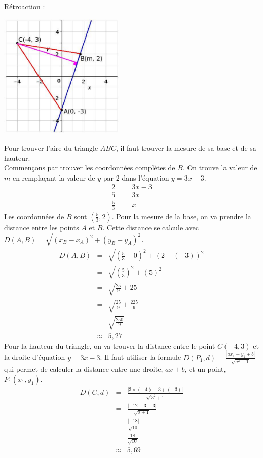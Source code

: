 \documentclass[letterpaper, 12pt]{article}
\begin{document}
R\'etroaction :\\
\begin{center}
 \includegraphics[width=6cm,bb=14 14 415 415]{Q2480r.eps}
\end{center}
Pour trouver l'aire du triangle $ABC$, il faut trouver la mesure de sa base et de sa hauteur. \\
Commen\c cons par trouver les coordonn\'ees compl\`etes de $B$. On trouve la valeur de $m$ en rempla\c cant la valeur de $y$ par 2 dans l'\'equation $y=3x-3$.
\begin{eqnarray*}
 2&=&3x-3\\
 5&=&3x\\[2mm]
 \frac{5}{3}&=&x
\end{eqnarray*}
 Les coordonn\'ees de $B$ sont $(\frac{5}{3}, 2)$. Pour la mesure de la base, on va prendre la distance entre les points $A$ et $B$. Cette distance se calcule avec $D(A, B)=\sqrt{(x_{B}-x_{A})^{2}+(y_{B}-y_{A})^{2}}$.
\begin{eqnarray*}
 D(A, B)&=&\sqrt{\left( \frac{5}{3}-0\right) ^{2}+(2-(-3))^{2}}\\[2mm]
&=&\sqrt{\left( \frac{5}{3}\right) ^{2}+(5)^{2}}\\[2mm]
&=&\sqrt{\frac{25}{9}+25}\\[2mm]
&=&\sqrt{\frac{25}{9}+\frac{225}{9}}\\[2mm]
&=&\sqrt{\frac{250}{9}}\\[2mm]
&\approx&5,27
\end{eqnarray*}
Pour la hauteur du triangle, on va trouver la distance entre le point $C(-4, 3)$ et la droite d'\'equation $y=3x-3$. Il faut utiliser la formule $D(P_{1}, d)=\frac{|ax_{1}-y_{1}+b|}{\sqrt{a^{2}+1}}$ qui permet de calculer la distance entre une droite, $ax+b$, et un point, $P_{1}(x_{1}, y_{1})$.
\begin{eqnarray*}
 D(C, d)&=&\frac{|3\times(-4)-3+(-3) |}{\sqrt{3^{2}+1}}\\[2mm]
&=&\frac{|-12-3-3|}{\sqrt{9+1}}\\[2mm]
&=&\frac{|-18|}{\sqrt{10}}\\[2mm]
&=&\frac{18}{\sqrt{10}}\\[2mm]
&\approx&5,69
\end{eqnarray*}
\end{document}
